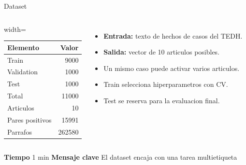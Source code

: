 \documentclass[aspectratio=169,10pt]{beamer}
\newcommand{\slidemeta}[2]{
  \vfill
  {\scriptsize\color{Muted}\textbf{Tiempo} #1 \hfill \textbf{Mensaje clave} #2}
}
\begin{document}
\begin{frame}{Dataset}
  \begin{columns}[T,onlytextwidth]
    \begin{adjustbox}{width=\linewidth}
    \begin{tabular}{lr}
      \toprule
      \textbf{Elemento} & \textbf{Valor}\\
      \midrule
      Train & 9000\\
      Validation & 1000\\
      Test & 1000\\
      Total & 11000\\
      Articulos & 10\\
      Pares positivos & 15991\\
      Parrafos & 262580\\
      \bottomrule
    \end{tabular}
    \end{adjustbox}
    \begin{itemize}
      \item \textbf{Entrada:} texto de hechos de casos del TEDH.
      \item \textbf{Salida:} vector de 10 articulos posibles.
      \item Un mismo caso puede activar varios articulos.
      \item Train selecciona hiperparametros con CV.
      \item Test se reserva para la evaluacion final.
    \end{itemize}
  \end{columns}
  \slidemeta{1 min}{El dataset encaja con una tarea multietiqueta}
\end{frame}
\end{document}
